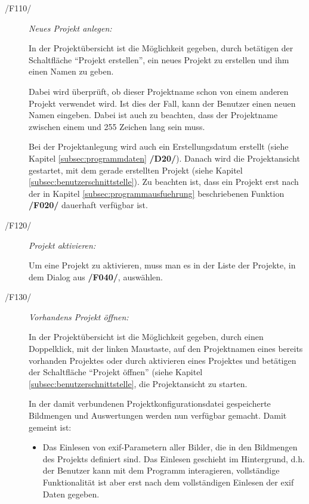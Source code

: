 	\begin{description}		
		
		\item[/F110/] \textit{Neues Projekt anlegen:}\par In der Projektübersicht ist die Möglichkeit gegeben, durch betätigen der Schaltfläche "`Projekt erstellen"', ein neues Projekt zu erstellen und ihm einen Namen zu geben.\par Dabei wird überprüft, ob dieser Projektname schon von einem anderen Projekt verwendet wird. Ist dies der Fall, kann der Benutzer einen neuen Namen eingeben. Dabei ist auch zu beachten, dass der Projektname zwischen einem und 255 Zeichen lang sein muss.\par Bei der Projektanlegung wird auch ein Erstellungsdatum erstellt (siehe Kapitel \ref{subsec:programmdaten} \textbf{/D20/}). Danach wird die Projektansicht gestartet, mit dem gerade erstellten Projekt (siehe Kapitel \ref{subsec:benutzerschnittstelle}). Zu beachten ist, dass ein Projekt erst nach der in Kapitel \ref{subsec:programmausfuehrung} beschriebenen Funktion \textbf{/F020/} dauerhaft verfügbar ist. 
		
		\item[/F120/] \textit{Projekt aktivieren:}\par Um eine Projekt zu aktivieren, muss man es in der Liste der Projekte, in dem Dialog aus \textbf{/F040/}, auswählen.
		
		\item[/F130/] \textit{Vorhandens Projekt öffnen:}\par In der Projektübersicht ist die Möglichkeit gegeben, durch einen Doppelklick, mit der linken Maustaste, auf den Projektnamen eines bereits vorhanden Projektes oder durch aktivieren eines Projektes und betätigen der Schaltfläche "`Projekt öffnen"' (siehe Kapitel \ref{subsec:benutzerschnittstelle}, die Projektansicht zu starten.\par In der damit verbundenen Projektkonfigurationsdatei gespeicherte Bildmengen und Auswertungen werden nun verfügbar gemacht. Damit gemeint ist: 
			
			\begin{itemize}
				
				\item Das Einlesen von \gls{exif}-Parametern aller Bilder, die in den Bildmengen des Projekts definiert sind. Das Einlesen geschieht im Hintergrund, d.h. der Benutzer kann mit dem Programm interagieren, vollständige Funktionalität ist aber erst nach dem vollständigen Einlesen der \gls{exif} Daten gegeben.
				

\end{itemize}
\end{description}
